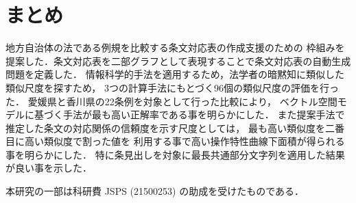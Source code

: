 \documentclass[japanese]{jnlp_1.4}
\begin{document}
\section{まとめ}

地方自治体の法である例規を比較する条文対応表の作成支援のための
枠組みを提案した．条文対応表を二部グラフとして表現することで条文対応表の自動生成問題を定義した．
情報科学的手法を適用するため，法学者の暗黙知に類似した類似尺度を探すため，
3つの計算手法にもとづく96個の類似尺度の評価を行った．
愛媛県と香川県の22条例を対象として行った比較により，
ベクトル空間モデルに基づく手法が最も高い正解率である事を明らかにした．
また提案手法で推定した条文の対応関係の信頼度を示す尺度としては，
最も高い類似度を二番目に高い類似度で割った値を
利用する事で高い操作特性曲線下面積が得られる事を明らかにした．
特に条見出しを対象に最長共通部分文字列を適用した結果が良い事を示した．




\acknowledgment
本研究の一部は科研費 JSPS (21500253) の助成を受けたものである．
\end{document}
